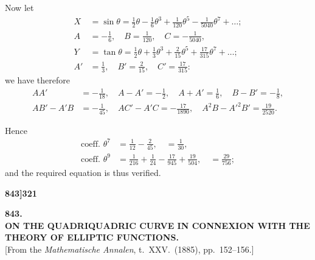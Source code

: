 \documentclass[12pt,a4paper]{article}
\theoremstyle{definition}
\begin{document}
Now let
\begin{align*}
X &= \sin\theta = \tfrac{1}{2}\theta - \tfrac{1}{6}\theta^3 + \tfrac{1}{120}\theta^5 - \tfrac{1}{5040}\theta^7 + \ldots; \\
A &= -\tfrac{1}{6}, \quad B = \tfrac{1}{120}, \quad C = -\tfrac{1}{5040}, \\
Y &= \tan\theta = \tfrac{1}{2}\theta + \tfrac{1}{3}\theta^3 + \tfrac{2}{15}\theta^5 + \tfrac{17}{315}\theta^7 + \ldots; \\
A' &= \tfrac{1}{3}, \quad B' = \tfrac{2}{15}, \quad C' = \tfrac{17}{315}:
\end{align*}
we have therefore
\begin{align*}
AA' &= -\tfrac{1}{18}, \quad A - A' = -\tfrac{1}{2}, \quad A + A' = \tfrac{1}{6}, \quad B - B' = -\tfrac{1}{8}, \\
AB' - A'B &= -\tfrac{1}{45}, \quad AC' - A'C = -\tfrac{17}{1890}, \quad A^2B - A'^2B' = \tfrac{19}{2520}.
\end{align*}

Hence
\begin{align*}
\text{coeff. } \theta^7 &= \tfrac{1}{12} - \tfrac{2}{45}, \quad = \tfrac{1}{30}, \\
\text{coeff. } \theta^9 &= \tfrac{1}{216} + \tfrac{1}{24} - \tfrac{17}{945} + \tfrac{19}{504}, \quad = \tfrac{29}{756};
\end{align*}
and the required equation is thus verified.

\vspace{2em}


\newpage
\setcounter{page}{321}

\noindent\textbf{843]}\hfill\textbf{321}

\bigskip

\begin{center}
{\Large\textbf{843.}}\\[1em]
{\large\textbf{ON THE QUADRIQUADRIC CURVE IN CONNEXION WITH THE THEORY OF ELLIPTIC FUNCTIONS.}}\\[1em]
[From the \textit{Mathematische Annalen}, t.\ XXV.\ (1885), pp.\ 152--156.]
\end{center}

\bigskip
\end{document}
